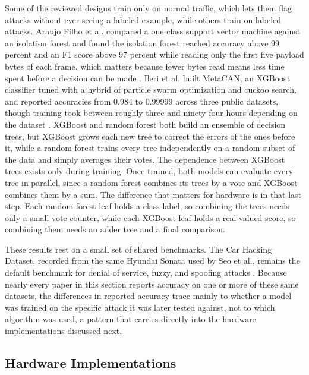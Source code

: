 \documentclass[11pt]{article}
\begin{document}
Some of the reviewed designs train only on normal traffic, which lets them flag attacks without ever seeing a labeled example, while others train on labeled attacks. Araujo Filho et al. compared a one class support vector machine against an isolation forest and found the isolation forest reached accuracy above 99 percent and an F1 score above 97 percent while reading only the first five payload bytes of each frame, which matters because fewer bytes read means less time spent before a decision can be made \cite{araujofilho2021}. Ileri et al. built MetaCAN, an XGBoost classifier tuned with a hybrid of particle swarm optimization and cuckoo search, and reported accuracies from 0.984 to 0.99999 across three public datasets, though training took between roughly three and ninety four hours depending on the dataset \cite{ileri2025}. XGBoost and random forest both build an ensemble of decision trees, but XGBoost grows each new tree to correct the errors of the ones before it, while a random forest trains every tree independently on a random subset of the data and simply averages their votes. The dependence between XGBoost trees exists only during training. Once trained, both models can evaluate every tree in parallel, since a random forest combines its trees by a vote and XGBoost combines them by a sum. The difference that matters for hardware is in that last step. Each random forest leaf holds a class label, so combining the trees needs only a small vote counter, while each XGBoost leaf holds a real valued score, so combining them needs an adder tree and a final comparison.

These results rest on a small set of shared benchmarks. The Car Hacking Dataset, recorded from the same Hyundai Sonata used by Seo et al., remains the default benchmark for denial of service, fuzzy, and spoofing attacks \cite{seo2018}. Because nearly every paper in this section reports accuracy on one or more of these same datasets, the differences in reported accuracy trace mainly to whether a model was trained on the specific attack it was later tested against, not to which algorithm was used, a pattern that carries directly into the hardware implementations discussed next.

\subsection{Hardware Implementations}
\end{document}
